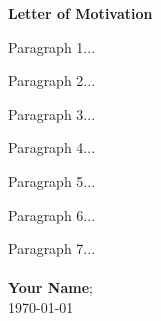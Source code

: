 \documentclass{article}
\begin{document}
\begin{center}
\huge{\textbf{Letter of Motivation}}
\end{center}

\large
\noindent 
Paragraph 1...

Paragraph 2...

Paragraph 3...

Paragraph 4...

Paragraph 5...

Paragraph 6...

Paragraph 7...
\\ \\
\noindent
\textbf{Your Name};
\\ 
\noindent 
\today
\end{document}
